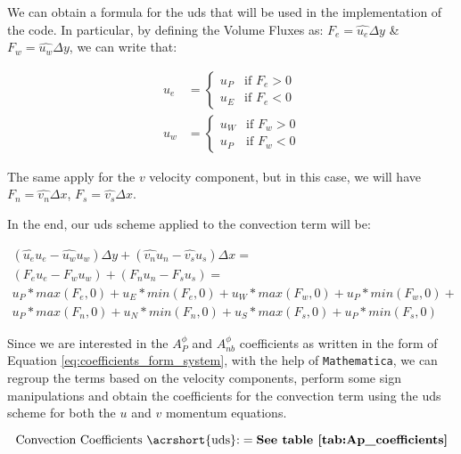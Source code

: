 We can obtain a formula for the \acrshort{uds} that will be used in the implementation of the code.
In particular, by defining the Volume Fluxes as: $F_e = \hat{u_e} \Delta y$ \& $F_w = \hat{u_w} \Delta y$, we can write that:

\begin{align}
    u_e & = \begin{cases}
                u_P & \text{if } F_e > 0 \\
                u_E & \text{if } F_e < 0
            \end{cases} \\
    u_w & = \begin{cases}
                u_W & \text{if } F_w > 0 \\
                u_P & \text{if } F_w < 0
            \end{cases}
\end{align}

The same apply for the $v$ velocity component, but in this case, we will have $F_n = \hat{v_n} \Delta x$, $F_s = \hat{v_s} \Delta x$.

In the end, our \acrfull{uds} scheme applied to the convection term will be:

\begin{gather*}
    \left(\hat{u_e}u_e - \hat{u_w}u_w\right) \Delta y + \left(\hat{v_n}u_n - \hat{v_s}u_s\right) \Delta x = \\
    \left(F_e u_e - F_w u_w\right) + \left(F_n u_n - F_s u_s\right) = \\
    u_P*max(F_e, 0) + u_E*min(F_e, 0) + u_W*max(F_w, 0) + u_P*min(F_w, 0) + \\
    u_P*max(F_n, 0) + u_N*min(F_n, 0) + u_S*max(F_s, 0) + u_P*min(F_s, 0)
\end{gather*}

Since we are interested in the $A_P^\phi$ and $A_{nb}^\phi$ coefficients as written in the form of Equation \ref{eq:coefficients_form_system}, with the help of \texttt{Mathematica}, we can regroup the terms based on the velocity components, perform some sign manipulations and obtain the coefficients for the convection term using the \acrshort{uds} scheme for both the $u$ and $v$ momentum equations.

\begin{equation}
    \text{Convection Coefficients \acrshort{uds}:} = { \textbf{See table \ref{tab:Ap_coefficients}} }
\end{equation}



